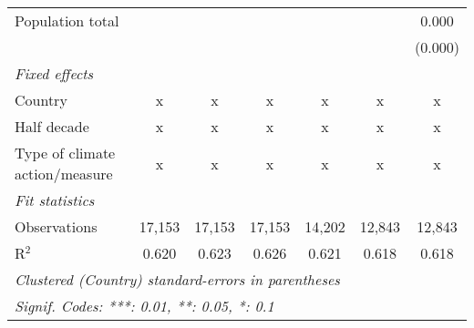 \begin{tabular}{lcccccc}
   Population total                                              &         &               &                &                &                & 0.000\\   
                                                                 &         &               &                &                &                & (0.000)\\   
   \emph{Fixed effects}\\
   Country                                                       & x       & x             & x              & x              & x              & x\\  
   Half decade                                                   & x       & x             & x              & x              & x              & x\\  
   Type of climate action/measure                                & x       & x             & x              & x              & x              & x\\  
   \midrule \emph{Fit statistics}\\
   Observations                                                  & 17,153  & 17,153        & 17,153         & 14,202         & 12,843         & 12,843\\  
   R$^2$                                                         & 0.620   & 0.623         & 0.626          & 0.621          & 0.618          & 0.618\\  
   \midrule
   \multicolumn{7}{l}{\emph{Clustered (Country) standard-errors in parentheses}}\\
   \multicolumn{7}{l}{\emph{Signif. Codes: ***: 0.01, **: 0.05, *: 0.1}}\\
\end{tabular}
\par\endgroup


